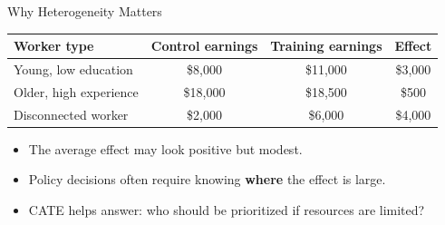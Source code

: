 \documentclass[hyperref={pdfpagelabels=false}]{beamer}
\begin{document}
\begin{frame}{Why Heterogeneity Matters}
\begin{center}
\small
\begin{tabular}{lccc}
\toprule
Worker type & Control earnings & Training earnings & Effect \\
\midrule
Young, low education & \$8,000 & \$11,000 & \$3,000 \\
Older, high experience & \$18,000 & \$18,500 & \$500 \\
Disconnected worker & \$2,000 & \$6,000 & \$4,000 \\
\bottomrule
\end{tabular}
\end{center}

\vspace{0.3cm}
\begin{itemize}
  \item The average effect may look positive but modest.
  \item Policy decisions often require knowing \textbf{where} the effect is large.
  \item CATE helps answer: who should be prioritized if resources are limited?
\end{itemize}
\end{frame}


\end{document}
